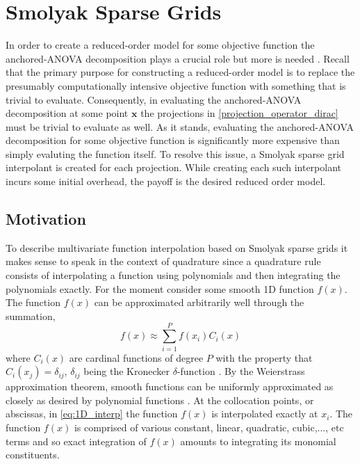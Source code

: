 \section{Smolyak Sparse Grids} \label{sec:smolyak_sg}

In order to create a reduced-order model for some objective function the anchored-\ac{ANOVA} decomposition plays a crucial role but more is needed \cite{Hesthaven_ANOVA}. Recall that the primary purpose for constructing a reduced-order model is to replace the presumably computationally intensive objective function with something that is trivial to evaluate. Consequently, in evaluating the anchored-\ac{ANOVA} decomposition at some point $\textbf{x}$ the projections in  \ref{projection_operator_dirac} must be trivial to evaluate as well. As it stands, evaluating the anchored-\ac{ANOVA} decomposition for some objective function is significantly more expensive than simply evaluting the function itself. To resolve this issue, a Smolyak sparse grid interpolant is created for each projection. While creating each such interpolant incurs some initial overhead, the payoff is the desired reduced order model. 

\subsection{Motivation} \label{subsec:motivation}

To describe multivariate function interpolation based on Smolyak sparse grids it makes sense to speak in the context of quadrature since a quadrature rule consists of interpolating a function using polynomials and then integrating the polynomials exactly. For the moment consider some smooth 1D function $f(x)$. The function $f(x)$ can be approximated arbitrarily well through the summation,
\begin{equation} \label{eq:1D_interp}
   f(x) \approx \sum_{i=1}^{P} f(x_i)C_i(x)
\end{equation}
where $C_i(x)$ are cardinal functions of degree $P$ with the property that $C_i(x_j)=\delta_{ij}$, $\delta_{ij}$ being the Kronecker $\delta$-function \cite{Boyd}. By the Weierstrass approximation theorem, smooth functions can be uniformly approximated as closely as desired by polynomial functions \cite{TrefethenApprox}. At the collocation points, or abscissas, in \ref{eq:1D_interp} the function $f(x)$ is interpolated exactly at $x_i$. The function $f(x)$ is comprised of various constant, linear, quadratic, cubic,..., etc terms and so exact integration of $f(x)$ amounts to integrating its monomial constituents.  

